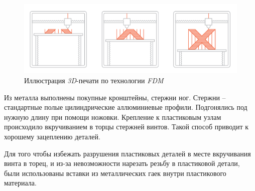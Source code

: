 \begin{figure}[h]
    \centering
    \includegraphics[scale=0.3]{chapter_mechanics_construction/figure1.png}
    \caption{Иллюстрация \textit{3D}-печати по технологии \textit{FDM}}
    \label{}
\end{figure}

Из металла выполнены покупные кронштейны, стержни ног. Стержни -- стандартные полые цилиндрические аллюминиевые профили. Подгонялись под нужную длину при помощи ножовки. Крепление к пластиковым узлам происходило вкручиванием в торцы стержней винтов. Такой способ приводит к хорошему зацеплению деталей.

Для того чтобы избежать разрушения пластиковых деталей в месте вкручивания винта в торец, и из-за невозможности нарезать резьбу в пластиковой детали, были использованы вставки из металлических гаек внутри пластикового материала.